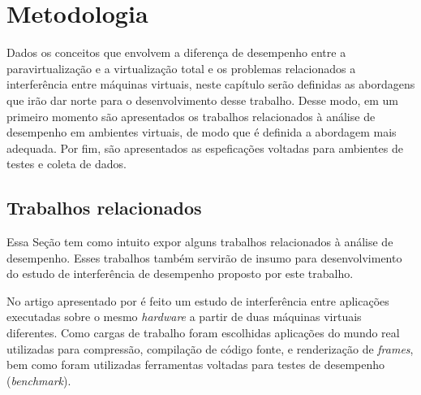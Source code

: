 \chapter{Metodologia}
\label{cap:metodologia}
Dados os conceitos que envolvem a diferença de desempenho entre a paravirtualização e a virtualização total e os problemas relacionados a interferência entre máquinas virtuais, neste capítulo serão definidas as abordagens que irão dar norte para o desenvolvimento desse trabalho. Desse modo, em um primeiro momento são apresentados os trabalhos relacionados à análise de desempenho em ambientes virtuais, de modo que é definida a abordagem mais adequada. Por fim, são apresentados as espeficações voltadas para ambientes de testes e coleta de dados.
\section{Trabalhos relacionados}
Essa Seção tem como intuito expor alguns trabalhos relacionados à análise de desempenho. Esses trabalhos também servirão de insumo para desenvolvimento do estudo de interferência de desempenho proposto por este trabalho.

No artigo apresentado por  é feito um estudo de interferência entre aplicações executadas sobre o mesmo \textit{hardware} a partir de duas máquinas virtuais diferentes. Como cargas de trabalho foram escolhidas aplicações do mundo real utilizadas para compressão, compilação de código fonte, e renderização de \textit{frames}, bem como foram utilizadas ferramentas voltadas para testes de desempenho (\textit{benchmark}).


